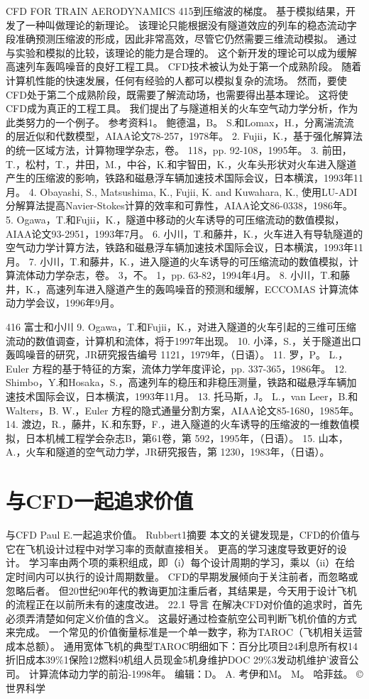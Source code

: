 \documentclass[UTF8,11pt,a4paper,openany,fontset=fandol]{ctexbook}
\begin{document}
CFD FOR TRAIN AERODYNAMICS 415到压缩波的梯度。 基于模拟结果，开发了一种叫做理论的新理论。 该理论只能根据没有隧道效应的列车的稳态流动字段准确预测压缩波的形成，因此非常高效，尽管它仍然需要三维流动模拟。 通过与实验和模拟的比较，该理论的能力是合理的。 这个新开发的理论可以成为缓解高速列车轰鸣噪音的良好工程工具。 CFD技术被认为处于第一个成熟阶段。 随着计算机性能的快速发展，任何有经验的人都可以模拟复杂的流场。 然而，要使CFD处于第二个成熟阶段，既需要了解流动场，也需要得出基本理论。 这将使CFD成为真正的工程工具。 我们提出了与隧道相关的火车空气动力学分析，作为此类努力的一个例子。 参考资料1。 鲍德温，B。 S.和Lomax，H.，分离湍流流的层近似和代数模型，AIAA论文78-257，1978年。 2. Fujii，K.，基于强化解算法的统一区域方法，计算物理学杂志，卷。 118，pp. 92-108，1995年。 3. 前田，T.，松村，T.，井田，M.，中谷，K.和宇智田，K.，火车头形状对火车进入隧道产生的压缩波的影响，铁路和磁悬浮车辆加速技术国际会议，日本横滨，1993年11月。 4. Obayashi, S., Matsushima, K., Fujii, K. and Kuwahara, K., 使用LU-ADI分解算法提高Navier-Stokes计算的效率和可靠性，AIAA论文86-0338，1986年。 5. Ogawa，T.和Fujii，K.，隧道中移动的火车诱导的可压缩流动的数值模拟，AIAA论文93-2951，1993年7月。 6. 小川，T.和藤井，K.，火车进入有导轨隧道的空气动力学计算方法，铁路和磁悬浮车辆加速技术国际会议，日本横滨，1993年11月。 7. 小川，T.和藤井，K.，进入隧道的火车诱导的可压缩流动的数值模拟，计算流体动力学杂志，卷。 3，不。 1，pp. 63-82，1994年4月。 8. 小川，T.和藤井，K.，高速列车进入隧道产生的轰鸣噪音的预测和缓解，ECCOMAS 计算流体动力学会议，1996年9月。

416 富士和小川 9. Ogawa，T.和Fujii，K.，对进入隧道的火车引起的三维可压缩流动的数值调查，计算机和流体，将于1997年出现。 10. 小泽，S.，关于隧道出口轰鸣噪音的研究，JR研究报告编号 1121，1979年，（日语）。 11. 罗，P。 L.，Euler 方程的基于特征的方案，流体力学年度评论，pp. 337-365，1986年。 12. Shimbo，Y.和Hosaka，S.，高速列车的稳压和非稳压测量，铁路和磁悬浮车辆加速技术国际会议，日本横滨，1993年11月。 13. 托马斯，J。 L.，van Leer，B.和Walters，B. W.，Euler 方程的隐式通量分割方案，AIAA论文85-1680，1985年。 14. 渡边，R.，藤井，K.和东野，F.，进入隧道的火车诱导的压缩波的一维数值模拟，日本机械工程学会杂志B，第61卷，第 592，1995年，（日语）。 15. 山本，A.，火车和隧道的空气动力学，JR研究报告，第 1230，1983年，（日语）。

\clearpage
\chapter{与CFD一起追求价值}
与CFD Paul E.一起追求价值。 Rubbert1摘要 本文的关键发现是，CFD的价值与它在飞机设计过程中对学习率的贡献直接相关。 更高的学习速度导致更好的设计。 学习率由两个项的乘积组成，即（i）每个设计周期的学习，乘以（ii）在给定时间内可以执行的设计周期数量。 CFD的早期发展倾向于关注前者，而忽略或忽略后者。 但20世纪90年代的教诲更加注重后者，其结果是，今天用于设计飞机的流程正在以前所未有的速度改进。 22.1 导言 在解决CFD对价值的追求时，首先必须弄清楚如何定义价值的含义。 这最好通过检查航空公司判断飞机价值的方式来完成。 一个常见的价值衡量标准是一个单一数字，称为TAROC（飞机相关运营成本总额）。 通用宽体飞机的典型TAROC明细如下：百分比项目24利息所有权14折旧成本39\%1保险12燃料9机组人员现金5机身维护DOC 29\%3发动机维护'波音公司。 计算流体动力学的前沿-1998年。 编辑：D。 A. 考伊和M。 M。 哈菲兹。 ©世界科学
\end{document}
